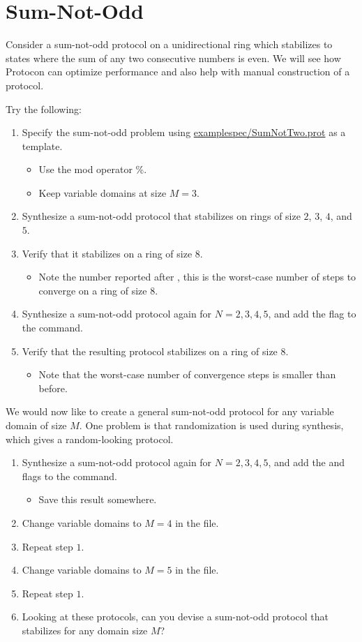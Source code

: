 \section{Sum-Not-Odd}

Consider a sum-not-odd protocol on a unidirectional ring which stabilizes to states where the sum of any two consecutive numbers is even.
We will see how Protocon can optimize performance and also help with manual construction of a protocol.

Try the following:
\begin{enumerate}
\item Specify the sum-not-odd problem using \url{examplespec/SumNotTwo.prot} as a template.
 \begin{itemize}
 \item Use the mod operator \%.
 \item Keep variable domains at size $M=3$.
 \end{itemize}
\item Synthesize a sum-not-odd protocol that stabilizes on rings of size $2$, $3$, $4$, and $5$.
\item Verify that it stabilizes on a ring of size $8$.
 \begin{itemize}
 \item Note the number reported after , this is the worst-case number of steps to converge on a ring of size $8$.
 \end{itemize}
\item Synthesize a sum-not-odd protocol again for $N=2,3,4,5$, and add the  flag to the command.
\item Verify that the resulting protocol stabilizes on a ring of size $8$.
 \begin{itemize}
 \item Note that the worst-case number of convergence steps is smaller than before.
 \end{itemize}
\end{enumerate}

We would now like to create a general sum-not-odd protocol for any variable domain of size $M$.
One problem is that randomization is used during synthesis, which gives a random-looking protocol.
\begin{enumerate}
\item Synthesize a sum-not-odd protocol again for $N=2,3,4,5$, and add the  and  flags to the command.
 \begin{itemize}
 \item Save this result somewhere.
 \end{itemize}
\item Change variable domains to $M=4$ in the file.
\item Repeat step $1$.
\item Change variable domains to $M=5$ in the file.
\item Repeat step $1$.
\item Looking at these protocols, can you devise a sum-not-odd protocol that stabilizes for any domain size $M$?
\end{enumerate}


